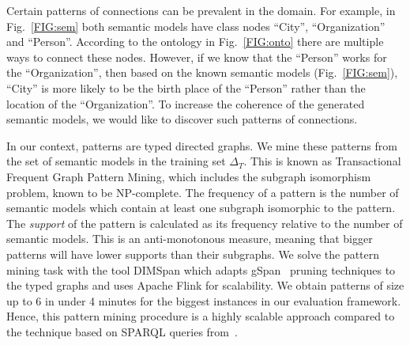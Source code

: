 \documentclass[letterpaper]{article} %
\newcommand{\authornote}[3]{
  {\fbox{\sc 
  #1}:$\blacktriangleright$\textcolor{#2}{\small{#3}}$\blacktriangleleft$}%
}
\newcommand{\ddg}[1]{\authornote{DDG}{blue}{#1}}
\newcommand{\npr}[1]{\authornote{NPR}{orange}{#1}}
\begin{document}
Certain patterns of connections can be prevalent in the domain.
For example, in Fig.~\ref{FIG:sem} both semantic models have class nodes ``City'', ``Organization'' and ``Person''.
According to the ontology in Fig.~\ref{FIG:onto} there are multiple ways to connect these nodes.
However, if we know that the ``Person'' works for the ``Organization'', then based on the known semantic models (Fig.~\ref{FIG:sem}), ``City'' is more likely to be the birth place of the ``Person'' rather than the location of the ``Organization''.
To increase the coherence of the generated semantic models, we would like to discover such patterns of connections.


In our context, patterns are typed directed graphs.
We mine these patterns from the set of semantic models in the training set $\Delta_T$.
This is known as Transactional Frequent Graph Pattern Mining, which
includes the subgraph isomorphism problem, known to be NP-complete.
The frequency of a pattern is the number of semantic models 
which contain
at least one subgraph isomorphic to the pattern.
The \emph{support} of the pattern is calculated as its 
frequency relative to the number of semantic models.
This is an anti-monotonous measure, meaning that bigger 
patterns will have lower supports than their subgraphs.
We solve the pattern mining task with the tool DIMSpan \cite{petermann2017dimspan} which adapts gSpan~\cite{yan2002gspan} pruning techniques to the typed graphs and uses Apache Flink for scalability.  
We obtain patterns of size up to 6 in under 4 minutes for the biggest instances 
in our evaluation framework.
Hence, this pattern mining procedure is a highly 
scalable approach compared to the technique based on SPARQL queries 
from~\cite{Taheriyan:Leveraging}.
\end{document}
